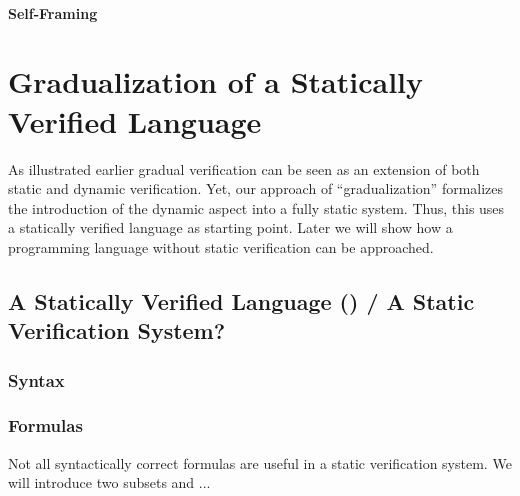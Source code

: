 \subsubsection{Self-Framing}





\chapter{Gradualization of a Statically Verified Language}

As illustrated earlier %
gradual verification can be seen as an extension of both static and dynamic verification.
Yet, our approach of “gradualization” formalizes the introduction of the dynamic aspect into a fully static system.
Thus, this %
uses a statically verified language as starting point.
Later %
we will show how a programming language without static verification can be approached.


\section{A Statically Verified Language (\svl) / A Static Verification System?}
\label{sec:a-statically-verified}


\subsection{Syntax}
\label{sec:syntax}


\subsection{Formulas}
Not all syntactically correct formulas are useful in a static verification system.
We will introduce two subsets \setFormulaA and \setFormulaB ...

